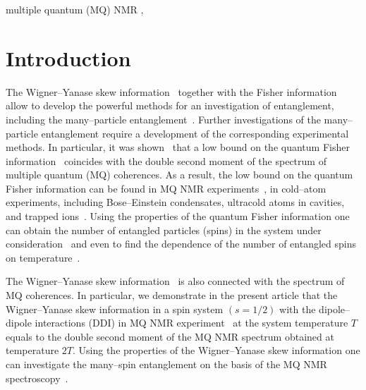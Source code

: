 \documentclass[preprint,12pt]{elsarticle}
\begin{document}
\begin{frontmatter}


\begin{keyword}
multiple quantum (MQ) NMR \sep
\end{keyword}

\end{frontmatter}

\linenumbers


\section{Introduction}
\label{sec:1}
The Wigner--Yanase skew information~\cite{1,2,3} together with the Fisher information~\cite{4,5} allow to develop the powerful methods for an investigation of entanglement, including the many--particle entanglement~\cite{6,7}.
Further investigations of the many--particle entanglement require a development of the corresponding experimental methods.
In particular, it was shown~\cite{6,8} that a low bound on the quantum Fisher information~\cite{4,5} coincides with the double second moment of the spectrum of multiple quantum (MQ) coherences.
As a result, the low bound on the quantum Fisher information can be found in MQ NMR experiments~\cite{9},
in cold--atom experiments, including Bose--Einstein condensates, ultracold atoms in cavities, and trapped ions~\cite{10,11,12,13,14}.
Using the properties of the quantum Fisher information one can obtain the number of entangled particles (spins) in the system under consideration~\cite{6}
and even to find the dependence of the number of entangled spins on temperature~\cite{8}.


The Wigner--Yanase skew information~\cite{1,2,3} is also connected with the spectrum of MQ coherences.
In particular, we demonstrate in the present article that the Wigner--Yanase skew information in a spin system $(s = 1/2)$ with the dipole--dipole interactions (DDI) in MQ NMR experiment~\cite{9} at the system temperature $T$ equals to the double second moment of the MQ NMR spectrum obtained at temperature $2T$.
Using the properties of the Wigner--Yanase skew information one can investigate the many--spin entanglement on the basis of the MQ NMR spectroscopy~\cite{9}.
\end{document}
